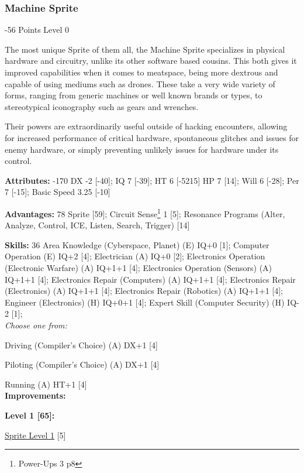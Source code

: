 \begin{multicols*}{3}
\subsubsection{Machine Sprite}
\begin{flushright}
	-56 Points Level 0
\end{flushright}

The most unique Sprite of them all, the Machine Sprite specializes in physical hardware and circuitry, unlike its other software based cousins. This both gives it improved capabilities when it comes to meatspace, being more dextrous and capable of using mediums such as drones. These take a very wide variety of forms, ranging from generic machines or well known brands or types, to stereotypical iconography such as gears and wrenches.

Their powers are extraordinarily useful outside of hacking encounters, allowing for increased performance of critical hardware, spontaneous glitches and issues for enemy hardware, or simply preventing unlikely issues for hardware under its control.

\textbf{Attributes:} -170
DX -2 [-40]; IQ 7 [-39]; HT 6 [-5215]
HP 7 [14]; Will 6 [-28]; Per 7 [-15]; Basic Speed 3.25 [-10]

\textbf{Advantages:} 78
Sprite [59]; Circuit Sense\footnote{Power-Ups 3 p8} 1 [5]; Resonance Programs (Alter, Analyze, Control, ICE, Listen, Search, Trigger) [14]

\textbf{Skills:} 36
Area Knowledge (Cyberspace, Planet) (E) IQ+0 [1]; Computer Operation (E) IQ+2 [4]; Electrician (A) IQ+0 [2]; Electronics Operation (Electronic Warfare) (A) IQ+1+1 [4]; Electronics Operation (Sensors) (A) IQ+1+1 [4]; Electronics Repair (Computers) (A) IQ+1+1 [4]; Electronics Repair (Electronics) (A) IQ+1+1 [4];  Electronics Repair (Robotics) (A) IQ+1+1 [4];  Engineer (Electronics) (H) IQ+0+1 [4]; Expert Skill (Computer Security) (H) IQ-2 [1]; \\

\textit{Choose one from:}

Driving (Compiler's Choice) (A) DX+1 [4]

Piloting (Compiler's Choice) (A) DX+1 [4]

Running (A) HT+1 [4]\\

\textbf{ Improvements:}

\textbf{Level 1 [65]:}

\hyperref[sprite_level]{Sprite Level 1} [5]


\end{multicols*}
